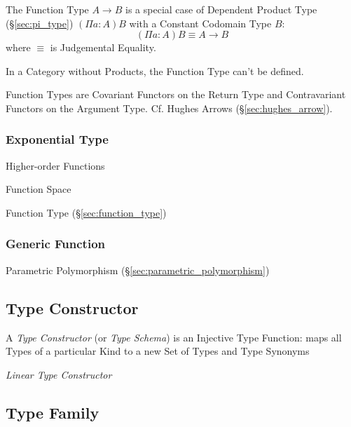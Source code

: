 The Function Type $A \rightarrow B$ is a special case of Dependent
Product Type (\S\ref{sec:pi_type}) $(\Pi a:A)B$ with a Constant
Codomain Type $B$:
\[
  (\Pi a:A)B \equiv A \rightarrow B
\]
where $\equiv$ is Judgemental Equality.

In a Category without Products, the Function Type can't be defined.

Function Types are Covariant Functors on the Return Type and
Contravariant Functors on the Argument Type. Cf. Hughes Arrows
(\S\ref{sec:hughes_arrow}).



\subsubsection{Exponential Type}\label{sec:exponential_type}

Higher-order Functions

Function Space

Function Type (\S\ref{sec:function_type})



\subsubsection{Generic Function}\label{sec:generic_function}

Parametric Polymorphism (\S\ref{sec:parametric_polymorphism})



\subsection{Type Constructor}\label{sec:type_constructor}

A \emph{Type Constructor} (or \emph{Type Schema}) is an Injective Type
Function: maps all Types of a particular Kind to a new Set of Types
and Type Synonyms

\emph{Linear Type Constructor} %



\subsection{Type Family}\label{sec:type_family}

